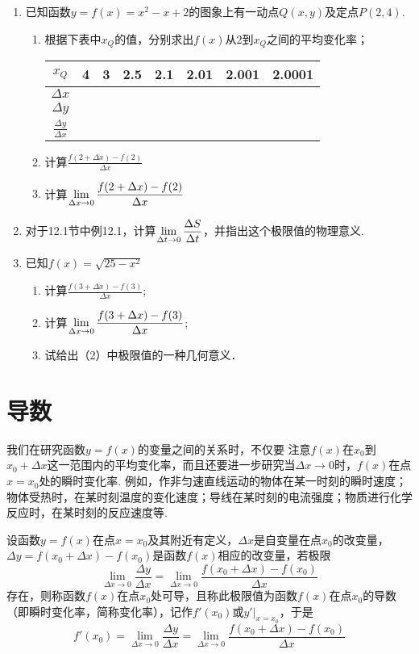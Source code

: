 \begin{ex}
\begin{enumerate}
    \item 已知函数$y=f(x)=x^2-x+2$的图象上有一动点$Q(x,y)$及定点$P(2,4)$.
\begin{enumerate}[(1)]
    \item 根据下表中$x_Q$的值，分别求出$f(x)$从2到$x_Q$之间的平均变化率；
\begin{center}
\begin{tabular}{c|ccccccc}
\hline
$x_Q$ & 4&3&2.5&2.1& 2.01& 2.001& 2.0001\\
\hline
$\Delta x$ \\
$\Delta y$ \\ [1.5ex]
$\frac{\Delta y}{\Delta x}$\\
\hline
\end{tabular}
\end{center}
\item 计算$\frac{f(2+\Delta x)-f(2)}{\Delta x}$
\item 计算$\lim\limits_{\Delta x\to 0}\dfrac{f(2+\Delta x)-f(2)}{\Delta x}$
\end{enumerate}

\item 对于12.1节中例12.1，计算$\lim\limits_{\Delta t\to 0}\dfrac{\Delta S}{\Delta t}$，并指出这个极限值的物理意义.
\item 已知$f(x)=\sqrt{25-x^2}$
\begin{enumerate}[(1)]
\item 计算$\frac{f(3+\Delta x)-f(3)}{\Delta x}$;
\item 计算$\lim\limits_{\Delta x\to 0}\dfrac{f(3+\Delta x)-f(3)}{\Delta x}$;
\item 试给出（2）中极限值的一种几何意义．
\end{enumerate}
\end{enumerate}
\end{ex}

\section{导数}
我们在研究函数$y=f(x)$的变量之间的关系时，不仅要
注意$f(x)$在$x_0$到$x_0+\Delta x$这一范围内的平均变化率，而且还要进一步研究当$\Delta x\to 0$时，$f(x)$在点$x=x_0$处的瞬时变化率. 例如，作非匀速直线运动的物体在某一时刻的瞬时速度；物体受热时，在某时刻温度的变化速度；导线在某时刻的电流强度；物质进行化学反应时，在某时刻的反应速度等.

设函数$y=f(x)$在点$x=x_0$及其附近有定义，$\Delta x$是自变量在点$x_0$的改变量，$\Delta y=f(x_0+\Delta x)-f(x_0)$是函数$f(x)$相应的改变量，若极限
\[\lim_{\Delta x\to 0}\frac{\Delta y}{\Delta x}=\lim_{\Delta x\to 0}\frac{f(x_0+\Delta x)-f(x_0)}{\Delta x}\]
存在，则称函数$f(x)$在点$x_0$处可导，且称此极限值为函数$f(x)$在点$x_0$的导数（即瞬时变化率，简称变化率），记作$f'(x_0)$或$y'\Big|_{x=x_0}$，于是
\[f'(x_0)=\lim_{\Delta x\to 0}\frac{\Delta y}{\Delta x}=\lim_{\Delta x\to 0}\frac{f(x_0+\Delta x)-f(x_0)}{\Delta x}\]

